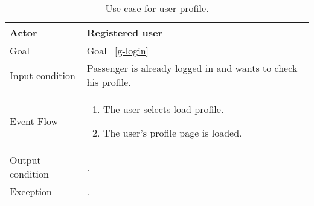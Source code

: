 \begin{table}
\begin{center}
\begin{tabular}{| l | p{} |}
\hline
Actor & Registered user \\
\hline
Goal & Goal ~\ref{g-login}
\\
\hline
Input condition & Passenger is already logged in and wants to check his profile.  \\
\hline
Event Flow & \begin{enumerate}
	\item The user selects load profile.
	\item The user's profile page is loaded.

	
	\end{enumerate}
\\
\hline
Output condition & . \\
\hline

Exception & . \\
\hline
\end{tabular}
\end{center}
\caption{Use case for user profile.}
\label{usecase-profile}
\end{table}




